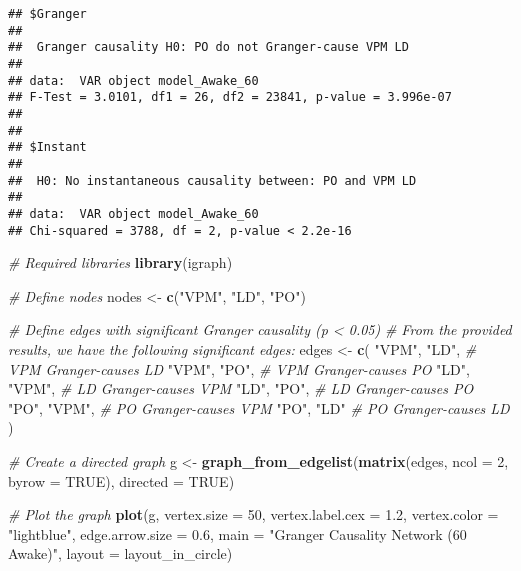 \documentclass[
]{article}
\newenvironment{Shaded}{\begin{snugshade}}{\end{snugshade}}
\newcommand{\AttributeTok}[1]{\textcolor[rgb]{0.13,0.29,0.53}{#1}}
\newcommand{\CommentTok}[1]{\textcolor[rgb]{0.56,0.35,0.01}{\textit{#1}}}
\newcommand{\ConstantTok}[1]{\textcolor[rgb]{0.56,0.35,0.01}{#1}}
\newcommand{\DecValTok}[1]{\textcolor[rgb]{0.00,0.00,0.81}{#1}}
\newcommand{\FloatTok}[1]{\textcolor[rgb]{0.00,0.00,0.81}{#1}}
\newcommand{\FunctionTok}[1]{\textcolor[rgb]{0.13,0.29,0.53}{\textbf{#1}}}
\newcommand{\NormalTok}[1]{#1}
\newcommand{\OtherTok}[1]{\textcolor[rgb]{0.56,0.35,0.01}{#1}}
\newcommand{\StringTok}[1]{\textcolor[rgb]{0.31,0.60,0.02}{#1}}
\begin{document}
\begin{verbatim}
## $Granger
## 
##  Granger causality H0: PO do not Granger-cause VPM LD
## 
## data:  VAR object model_Awake_60
## F-Test = 3.0101, df1 = 26, df2 = 23841, p-value = 3.996e-07
## 
## 
## $Instant
## 
##  H0: No instantaneous causality between: PO and VPM LD
## 
## data:  VAR object model_Awake_60
## Chi-squared = 3788, df = 2, p-value < 2.2e-16
\end{verbatim}

\begin{Shaded}
\begin{Highlighting}[]
\CommentTok{\# Required libraries}
\FunctionTok{library}\NormalTok{(igraph)}

\CommentTok{\# Define nodes}
\NormalTok{nodes }\OtherTok{\textless{}{-}} \FunctionTok{c}\NormalTok{(}\StringTok{"VPM"}\NormalTok{, }\StringTok{"LD"}\NormalTok{, }\StringTok{"PO"}\NormalTok{)}

\CommentTok{\# Define edges with significant Granger causality (p \textless{} 0.05)}
\CommentTok{\# From the provided results, we have the following significant edges:}
\NormalTok{edges }\OtherTok{\textless{}{-}} \FunctionTok{c}\NormalTok{(}
  \StringTok{"VPM"}\NormalTok{, }\StringTok{"LD"}\NormalTok{,  }\CommentTok{\# VPM Granger{-}causes LD}
  \StringTok{"VPM"}\NormalTok{, }\StringTok{"PO"}\NormalTok{,  }\CommentTok{\# VPM Granger{-}causes PO}
  \StringTok{"LD"}\NormalTok{, }\StringTok{"VPM"}\NormalTok{,  }\CommentTok{\# LD Granger{-}causes VPM}
  \StringTok{"LD"}\NormalTok{, }\StringTok{"PO"}\NormalTok{,   }\CommentTok{\# LD Granger{-}causes PO}
  \StringTok{"PO"}\NormalTok{, }\StringTok{"VPM"}\NormalTok{,  }\CommentTok{\# PO Granger{-}causes VPM}
  \StringTok{"PO"}\NormalTok{, }\StringTok{"LD"}    \CommentTok{\# PO Granger{-}causes LD}
\NormalTok{)}

\CommentTok{\# Create a directed graph}
\NormalTok{g }\OtherTok{\textless{}{-}} \FunctionTok{graph\_from\_edgelist}\NormalTok{(}\FunctionTok{matrix}\NormalTok{(edges, }\AttributeTok{ncol =} \DecValTok{2}\NormalTok{, }\AttributeTok{byrow =} \ConstantTok{TRUE}\NormalTok{), }\AttributeTok{directed =} \ConstantTok{TRUE}\NormalTok{)}

\CommentTok{\# Plot the graph}
\FunctionTok{plot}\NormalTok{(g,}
     \AttributeTok{vertex.size =} \DecValTok{50}\NormalTok{,}
     \AttributeTok{vertex.label.cex =} \FloatTok{1.2}\NormalTok{,}
     \AttributeTok{vertex.color =} \StringTok{"lightblue"}\NormalTok{,}
     \AttributeTok{edge.arrow.size =} \FloatTok{0.6}\NormalTok{,}
     \AttributeTok{main =} \StringTok{"Granger Causality Network (60 Awake)"}\NormalTok{,}
     \AttributeTok{layout =}\NormalTok{ layout\_in\_circle)}
\end{Highlighting}
\end{Shaded}
\end{document}
